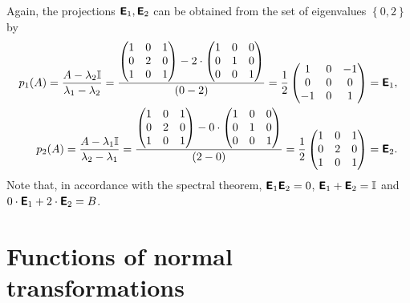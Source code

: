 {Again, the projections $\textsf{\textbf{E}}_1, \textsf{\textbf{E}}_2$
can be obtained from  the set of eigenvalues $\left\{  0,2 \right\}$ by
\begin{equation}
\begin{split}
p_1(A)=   \frac{A-\lambda_2{\Bbb I}}{\lambda_1-\lambda_2}
=
\frac{
\begin{pmatrix}
1&0&1\\
0&2&0\\
1&0&1
\end{pmatrix}
-
2\cdot
\begin{pmatrix}
1&0&0\\
0&1&0\\
0&0&1
\end{pmatrix}
}
{(0-2)}
=
\frac{1}{2}
\begin{pmatrix}
1&0&-1\\
0&0&0\\
-1&0&1
\end{pmatrix}
=\textsf{\textbf{E}}_1
,\\
p_2(A)=   \frac{A-\lambda_1{\Bbb I}}{\lambda_2-\lambda_1}
=
\frac{
\begin{pmatrix}
1&0&1\\
0&2&0\\
1&0&1
\end{pmatrix}
-
0\cdot
\begin{pmatrix}
1&0&0\\
0&1&0\\
0&0&1
\end{pmatrix}
}
{(2-0)}
=
\frac{1}{2}
\begin{pmatrix}
1&0&1\\
0&2&0\\
1&0&1
\end{pmatrix}
=\textsf{\textbf{E}}_2.
\end{split}
\end{equation}
Note that, in accordance with the spectral theorem,
$\textsf{\textbf{E}}_1 \textsf{\textbf{E}}_2=0 $,
$\textsf{\textbf{E}}_1+\textsf{\textbf{E}}_2={\Bbb I}$
and
$0\cdot \textsf{\textbf{E}}_1+2\cdot \textsf{\textbf{E}}_2=B$.

\eexample
}







\section{Functions of normal transformations}

